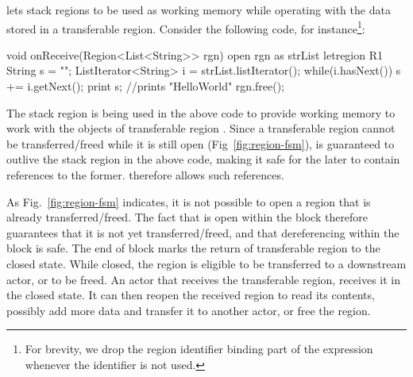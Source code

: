 {\name lets stack regions to be used as working memory while operating
with the data stored in a transferable region. Consider the following
code, for instance\footnote{For brevity, we drop the region identifier
binding part of the  expression whenever the identifier is not
used.}: \begin{codejava} void onReceive(Region<List<String>> rgn) open
rgn as strList { letregion R1 { String s = ""; ListIterator<String> i
= strList.listIterator(); while(i.hasNext()) { s += i.getNext(); }
print s; //prints "HelloWorld" } } rgn.free(); \end{codejava} The
stack region  is being used in the above code to provide working
memory to work with the objects of transferable region . Since
a transferable region cannot be transferred/freed while it is still
open (Fig~\ref{fig:region-fsm}),  is guaranteed to outlive the
stack region  in the above code, making it safe for the later to
contain references to the former. \name therefore allows such
references.

As Fig.~\ref{fig:region-fsm} indicates, it is not possible to open a
region that is already transferred/freed. The fact that  is
open within the block therefore guarantees that it is not yet
transferred/freed, and that dereferencing  within the block
is safe. The end of  block marks the return of transferable
region to the closed state.  While closed, the region is eligible to
be transferred to a downstream actor, or to be freed.  An actor that
receives the transferable region, receives it in the closed state. It
can then reopen the received region to read its contents, possibly add
more data and transfer it to another actor, or free the region. 

}

